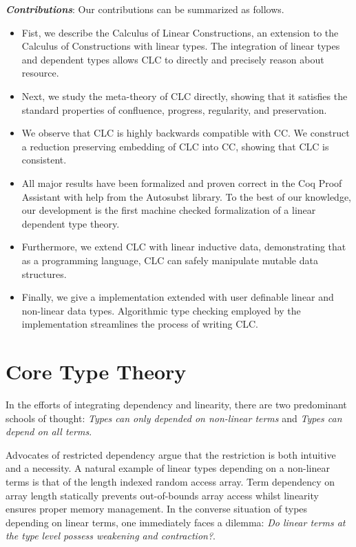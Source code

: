 \documentclass{article}
\begin{document}
  \medskip

  \noindent \textbf{\textit{Contributions}}: 
  Our contributions can be summarized as follows.
  \begin{itemize}
    \item Fist, we describe the Calculus of Linear Constructions, an extension to the Calculus of Constructions with linear types. The integration of linear types and dependent types allows CLC to directly and precisely reason about resource.
    \item Next, we study the meta-theory of CLC directly, showing that it satisfies the standard properties of confluence, progress, regularity, and preservation. 
    \item We observe that CLC is highly backwards compatible with CC. We construct a reduction preserving embedding of CLC into CC, showing that CLC is consistent. 
    \item All major results have been formalized and proven correct in the Coq Proof Assistant with help from the Autosubst \cite{autosubst} library. To the best of our knowledge, our development is the first machine checked formalization of a linear dependent type theory.
    \item Furthermore, we extend CLC with linear inductive data, demonstrating that as a programming language, CLC can safely manipulate mutable data structures.
    \item Finally, we give a implementation extended with user definable linear and non-linear data types. Algorithmic type checking employed by the implementation streamlines the process of writing CLC.
  \end{itemize}

  \section{Core Type Theory}
  In the efforts of integrating dependency and linearity, there are two predominant schools of thought: \textit{Types can only depended on non-linear terms} and \textit{Types can depend on all terms}. 
  
  Advocates of restricted dependency argue that the restriction is both intuitive and a necessity. A natural example of linear types depending on a non-linear terms is that of the length indexed random access array. Term dependency on array length statically prevents out-of-bounds array access whilst linearity ensures proper memory management. In the converse situation of types depending on linear terms, one immediately faces a dilemma: \textit{Do linear terms at the type level possess weakening and contraction?}.
  
\end{document}
